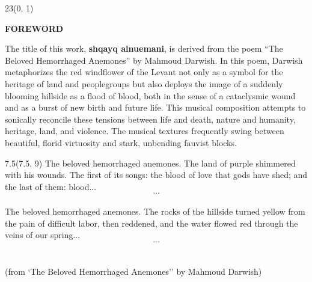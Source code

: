 \documentclass[11pt]{article}
\begin{document}
\begin{textblock}{23}(0, 1)
\begin{center}
\color{myblack}
\huge \textbf{FOREWORD}
\end{center}
\end{textblock}

\vspace*{0.25\baselineskip}

\begingroup

\begin{center}
The title of this work, \textbf{shqayq alnuemani}, is derived from the poem ``The Beloved Hemorrhaged Anemones'' by Mahmoud Darwish. In this poem, Darwish metaphorizes the red windflower of the Levant not only as a symbol for the heritage of land and peoplegroups but also deploys the image of a suddenly blooming hillside as a flood of blood, both in the sense of a cataclysmic wound and as a burst of new birth and future life. This musical composition attempts to sonically reconcile these tensions between life and death, nature and humanity, heritage, land, and violence. The musical textures frequently swing between beautiful, florid virtuosity and stark, unbending fauvist blocks. 
\rightskip\leftskip
\phantom{text} \hfill \phantom{()}

\vspace*{1.25\baselineskip}

\begin{textblock}{7.5}(7.5, 9)
\color{mypink}
The beloved hemorrhaged anemones.
The land of purple shimmered with his wounds.
The first of its songs: the blood of love that gods have shed;
and the last of them: blood...
\\
\[...\]
\\
The beloved hemorrhaged anemones.
The rocks of the hillside turned yellow
from the pain of difficult labor,
then reddened,
and the water flowed red
through the veins of our spring...
\\
\[...\]
\rightskip\leftskip
\\
\phantom{text} \hfill \phantom{()}
\\
(from `The Beloved Hemorrhaged Anemones'' by Mahmoud Darwish)

\end{textblock}


\end{center}

\endgroup

\vspace*{17\baselineskip}
\end{document}
